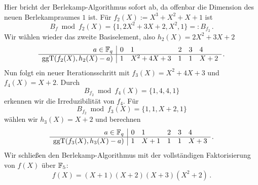 \begin{beispiel}
  Hier bricht der Berlekamp-Algorithmus sofort ab, da offenbar die Dimension
  des neuen Berlekampraumes $1$ ist.
  Für $f_2(X) := X^3+X^2+X+1$ ist
  \[ B_f \bmod f_2(X) = \{ 1, 2X^2+3X+2, X^2, 1\} =: B_{f_2}\,.\]
  Wir wählen wieder das zweite Basiselement, also $h_2(X) = 2X^2+3X+2$
  \[ \begin{array}{r|lllll}
      a\in \mathbb{F}_q & 0 & 1 & 2 & 3 & 4 \\\hline
      \operatorname{ggT}(f_2(X), h_2(X)-a) &1 & X^2+4X+3 & 1 & 1 & X+2\end{array}\,.\]
  Nun folgt ein neuer Iterationsschritt mit $f_3(X) = X^2+4X+3$ und
  $f_4(X) = X+2$.
  Durch 
  \[ B_{f_2} \bmod f_4(X) = \{ 1, 4, 4, 1\}\]
  erkennen wir die Irreduzibilität von $f_4$. Für 
  \[ B_{f_2} \bmod f_3(X) = \{ 1, 1, X+2, 1\}\]
  wählen wir $h_3(X) = X+2$ und berechnen 
  \[ \begin{array}{r|lllll}
      a\in \mathbb{F}_q & 0 & 1 & 2 & 3 & 4 \\\hline
      \operatorname{ggT}(f_3(X), h_3(X)-a) &1 & X+1 & 1 & 1 & X+3\end{array}\,.\]
  Wir schließen den Berlekamp-Algorithmus mit der vollständigen 
  Faktorisierung von $f(X)$ über $\mathbb{F}_5$:
  \[ f(X) = (X+1)(X+2)(X+3)(X^2+2)\,.\]



\end{beispiel}
